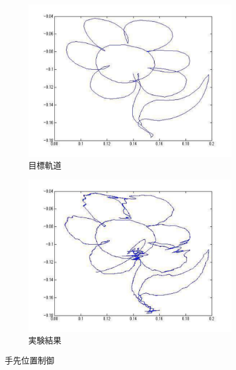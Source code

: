 \begin{figure}[H]
    \centering
    \begin{subfigure}[b]{0.45\linewidth}
        \centering
        \includegraphics[width=\linewidth]{figure/mokuhyouchi.pdf}
        \caption{目標軌道}
    \end{subfigure}
    \begin{subfigure}[b]{0.45\linewidth}
        \centering
        \includegraphics[width=\linewidth]{figure/zikkennkekka.pdf}
        \caption{実験結果}
    \end{subfigure}
    \caption{手先位置制御}
    \label{fig:xy_flower_result}
\end{figure}
